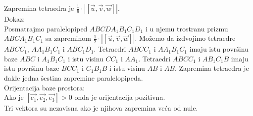 \documentclass[12pt]{article}
\newcommand{\vek}[1]{\overrightarrow{#1}}
\begin{document}
    Zapremina tetraedra je $\frac{1}{6}\cdot |[\vek{u},\vek{v},\vek{w}]|$.\\
    Dokaz:\\
    Posmatrajmo paralelopiped $ABCDA_1B_1C_1D_1$ i u njemu trostranu prizmu $ABCA_1B_1C_1$ sa zapreminom
$\frac{1}{2}\cdot|[\vek{u},\vek{v},\vek{w}]|$. Možemo da izdvojimo tetraedre $ABCC_1$, $AA_1B_1C_1$ i $ABC_1D_1$.
    Tetraedri $ABCC_1$ i $AA_1B_1C_1$ imaju istu površinu baze $ABC$ i $A_1B_1C_1$ i istu visinu $CC_1$ i $AA_1$.
    Tetraedri $ABCC_1$ i $AB_1C_1B$ imaju istu površinu baze $BCC_1$ i $C_1B_1B$ i istu visinu $AB$ i $AB$.
    Zapremina tetraedra je dakle jedna šestina zapremine paralelopipeda.\\
    Orijentacija baze prostora:\\
    Ako je $[\vek{e_1},\vek{e_2},\vek{e_3}]>0$ onda je orijentacija pozitivna.\\
    Tri vektora su nezavisna ako je njihova zapremina veća od nule.
    \par
\end{document}
